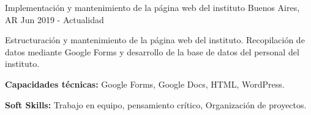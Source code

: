 \begin{cventries}
    {Implementación y mantenimiento de la página web del instituto} %
    {Buenos Aires, AR} %
    {Jun 2019 - Actualidad} %
    {
      \begin{cvitems} %
        \item {Estructuración y mantenimiento de la página web del instituto. Recopilación de datos mediante Google Forms y desarrollo de la base de datos del personal del instituto.}
        \item {\textbf{Capacidades técnicas:} Google Forms, Google Docs, HTML, WordPress.}
        \item {\textbf{Soft Skills:} Trabajo en equipo, pensamiento crítico, Organización de proyectos.}
      \end{cvitems}
    }
\end{cventries}

